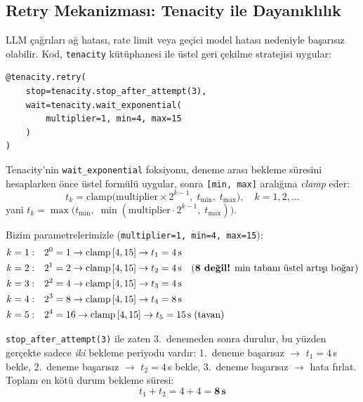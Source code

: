 \subsection{Retry Mekanizmas{\i}: Tenacity ile Dayan{\i}kl{\i}l{\i}k}

LLM \c{c}a\u{g}r{\i}lar{\i} a\u{g} hatas{\i}, rate limit veya ge\c{c}ici model hatas{\i} nedeniyle ba\c{s}ar{\i}s{\i}z olabilir. Kod, \texttt{tenacity} k\"{u}t\"{u}phanesi ile \"{u}stel geri \c{c}ekilme stratejisi uygular:

\begin{verbatim}
@tenacity.retry(
    stop=tenacity.stop_after_attempt(3),
    wait=tenacity.wait_exponential(
        multiplier=1, min=4, max=15
    )
)
\end{verbatim}

Tenacity'nin \texttt{wait\_exponential} foksiyonu, deneme aras{\i} bekleme s\"{u}resini hesaplarken \"{o}nce \"{u}stel form\"{u}l\"{u} uygular, sonra \texttt{[min,\,max]} aral{\i}\u{g}{\i}na \emph{clamp} eder:
\begin{equation}
\label{eq:exponential-backoff}
t_k = \mathrm{clamp}\bigl(\text{multiplier} \times 2^{k-1},\; t_{\min},\; t_{\max}\bigr), \quad k = 1, 2, \dots
\end{equation}
yani $t_k = \max\bigl(t_{\min},\; \min(\text{multiplier}\cdot 2^{k-1},\; t_{\max})\bigr)$.

\noindent Bizim parametrelerimizle (\texttt{multiplier=1, min=4, max=15}):
\begin{align*}
k=1:&\quad 2^0 = 1 \to \text{clamp}\,[4,15] \to t_1 = 4\,\text{s}\\
k=2:&\quad 2^1 = 2 \to \text{clamp}\,[4,15] \to t_2 = 4\,\text{s}\quad\text{(\textbf{8 de\u{g}il!} min taban{\i} \"{u}stel art{\i}\c{s}{\i} bo\u{g}ar)}\\
k=3:&\quad 2^2 = 4 \to \text{clamp}\,[4,15] \to t_3 = 4\,\text{s}\\
k=4:&\quad 2^3 = 8 \to \text{clamp}\,[4,15] \to t_4 = 8\,\text{s}\\
k=5:&\quad 2^4 = 16 \to \text{clamp}\,[4,15] \to t_5 = 15\,\text{s\;(tavan)}
\end{align*}

\texttt{stop\_after\_attempt(3)} ile zaten 3.\ denemeden sonra durulur, bu y\"{u}zden ger\c{c}ekte sadece \emph{iki} bekleme periyodu vard{\i}r: 1.\ deneme ba\c{s}ar{\i}s{\i}z $\to$ $t_1=4$\,s bekle, 2.\ deneme ba\c{s}ar{\i}s{\i}z $\to$ $t_2=4$\,s bekle, 3.\ deneme ba\c{s}ar{\i}s{\i}z $\to$ hata f{\i}rlat. Toplam en k\"{o}t\"{u} durum bekleme s\"{u}resi:
\begin{equation*}
t_1 + t_2 = 4 + 4 = \mathbf{8\,\text{s}}
\end{equation*}

